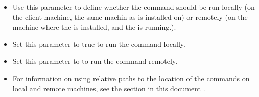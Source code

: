 
\begin{itemize}
\item Use this parameter to define whether the command should be run locally (on the client machine, the same machin as \gd{} is installed on) or remotely (on the machine where the \gdserver{} is installed, and the \gdaut{} is running.). 
\item Set this parameter to true to run the command locally.
\item Set this parameter to \gdrefbooleanfalse to run the command remotely. 
\item  For information on using relative paths to the location of the commands on local and remote machines, see the section in this document .
\end{itemize}
